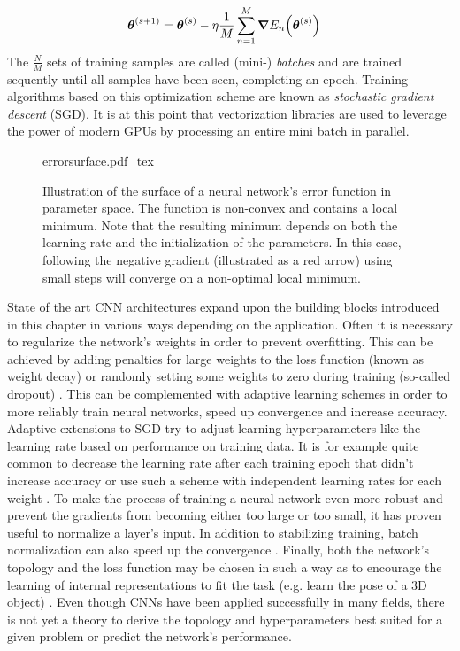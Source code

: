 \begin{align}
    \vb*{\theta}^{(s+1)} &= \vb*{\theta}^{(s)}-\eta\frac{1}{M} \sum_{n=1}^M\grad{E_n\qty(\vb*{\theta}^{(s)})}
\end{align}
The $\frac{N}{M}$ sets of training samples are called (mini-) \emph{batches} and are trained sequently until all samples have been seen, completing an epoch. Training algorithms based on this optimization scheme are known as \emph{stochastic gradient descent} (SGD). It is at this point that vectorization libraries are used to leverage the power of modern GPUs by processing an entire mini batch in parallel.
\begin{figure}[H]
    \centering
\def\svgwidth{.5\textwidth}
{errorsurface.pdf_tex}
\caption[Illustration of a neural network's error function]{Illustration of the surface of a neural network's error function in parameter space. The function is non-convex and contains a local minimum. Note that the resulting minimum depends on both the learning rate and the initialization of the parameters. In this case, following the negative gradient (illustrated as a red arrow) using small steps will converge on a non-optimal local minimum.}
\label{fig:errorsurf}
\end{figure}\noindent
State of the art CNN architectures expand upon the building blocks introduced in this chapter in various ways depending on the application. Often it is necessary to regularize the network's weights in order to prevent overfitting. This can be achieved by adding penalties for large weights to the loss function (known as weight decay) or randomly setting some weights to zero during training (so-called dropout) \cite{srivastava2014dropout,pmlr-v28-wan13,krogh1992simple,treadgold1998simulated}. This can be complemented with adaptive learning schemes in order to more reliably train neural networks, speed up convergence and increase accuracy. Adaptive extensions to SGD try to adjust learning hyperparameters like the learning rate based on performance on training data. It is for example quite common to decrease the learning rate after each training epoch that didn't increase accuracy or use such a scheme with independent learning rates for each weight \cite{zeiler2012adadelta,duchi2011adaptive,kingma2014adam,polyak1992acceleration,graves2013generating,sutskever2013importance,loshchilov2016sgdr}. To make the process of training a neural network even more robust and prevent the gradients from becoming either too large or too small, it has proven useful to normalize a layer's input. In addition to stabilizing training, batch normalization can also speed up the convergence \cite{ba2016layer,ioffe2015batch,salimans2016weight}. Finally, both the network's topology and the loss function may be chosen in such a way as to encourage the learning of internal representations to fit the task (e.g. learn the pose of a 3D object) \cite{worrall2018cubenet,worrall2017harmonic,schmidt2012learning,cohen2016group}. Even though CNNs have been applied successfully in many fields, there is not yet a theory to derive the topology and hyperparameters best suited for a given problem or predict the network's performance.
